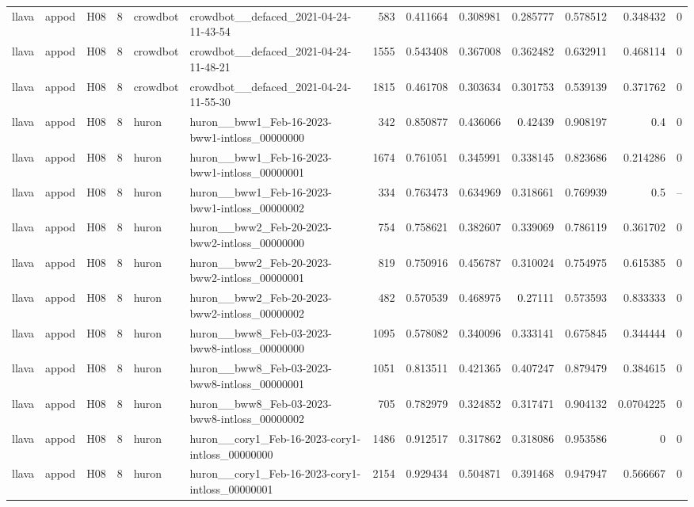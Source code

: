 \begin{longtable}{lllrllrrrrrrr}
llava & appod & H08 & 8 & crowdbot & crowdbot\_\_defaced\_2021-04-24-11-43-54 & 583 & 0.411664 & 0.308981 & 0.285777 & 0.578512 & 0.348432 & 0 \\
llava & appod & H08 & 8 & crowdbot & crowdbot\_\_defaced\_2021-04-24-11-48-21 & 1555 & 0.543408 & 0.367008 & 0.362482 & 0.632911 & 0.468114 & 0 \\
llava & appod & H08 & 8 & crowdbot & crowdbot\_\_defaced\_2021-04-24-11-55-30 & 1815 & 0.461708 & 0.303634 & 0.301753 & 0.539139 & 0.371762 & 0 \\
llava & appod & H08 & 8 & huron & huron\_\_bww1\_Feb-16-2023-bww1-intloss\_00000000 & 342 & 0.850877 & 0.436066 & 0.42439 & 0.908197 & 0.4 & 0 \\
llava & appod & H08 & 8 & huron & huron\_\_bww1\_Feb-16-2023-bww1-intloss\_00000001 & 1674 & 0.761051 & 0.345991 & 0.338145 & 0.823686 & 0.214286 & 0 \\
llava & appod & H08 & 8 & huron & huron\_\_bww1\_Feb-16-2023-bww1-intloss\_00000002 & 334 & 0.763473 & 0.634969 & 0.318661 & 0.769939 & 0.5 & -- \\
llava & appod & H08 & 8 & huron & huron\_\_bww2\_Feb-20-2023-bww2-intloss\_00000000 & 754 & 0.758621 & 0.382607 & 0.339069 & 0.786119 & 0.361702 & 0 \\
llava & appod & H08 & 8 & huron & huron\_\_bww2\_Feb-20-2023-bww2-intloss\_00000001 & 819 & 0.750916 & 0.456787 & 0.310024 & 0.754975 & 0.615385 & 0 \\
llava & appod & H08 & 8 & huron & huron\_\_bww2\_Feb-20-2023-bww2-intloss\_00000002 & 482 & 0.570539 & 0.468975 & 0.27111 & 0.573593 & 0.833333 & 0 \\
llava & appod & H08 & 8 & huron & huron\_\_bww8\_Feb-03-2023-bww8-intloss\_00000000 & 1095 & 0.578082 & 0.340096 & 0.333141 & 0.675845 & 0.344444 & 0 \\
llava & appod & H08 & 8 & huron & huron\_\_bww8\_Feb-03-2023-bww8-intloss\_00000001 & 1051 & 0.813511 & 0.421365 & 0.407247 & 0.879479 & 0.384615 & 0 \\
llava & appod & H08 & 8 & huron & huron\_\_bww8\_Feb-03-2023-bww8-intloss\_00000002 & 705 & 0.782979 & 0.324852 & 0.317471 & 0.904132 & 0.0704225 & 0 \\
llava & appod & H08 & 8 & huron & huron\_\_cory1\_Feb-16-2023-cory1-intloss\_00000000 & 1486 & 0.912517 & 0.317862 & 0.318086 & 0.953586 & 0 & 0 \\
llava & appod & H08 & 8 & huron & huron\_\_cory1\_Feb-16-2023-cory1-intloss\_00000001 & 2154 & 0.929434 & 0.504871 & 0.391468 & 0.947947 & 0.566667 & 0 \\

\end{longtable}
